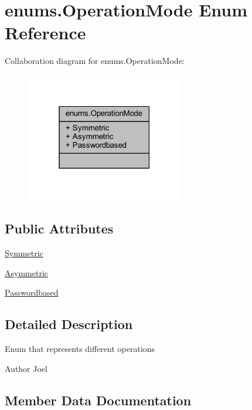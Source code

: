 \hypertarget{enumenums_1_1_operation_mode}{}\section{enums.\+Operation\+Mode Enum Reference}
\label{enumenums_1_1_operation_mode}


Collaboration diagram for enums.\+Operation\+Mode\+:\nopagebreak
\begin{figure}[H]
\begin{center}
\leavevmode
\includegraphics[width=195pt]{enumenums_1_1_operation_mode__coll__graph}
\end{center}
\end{figure}
\subsection*{Public Attributes}
\begin{DoxyCompactItemize}
\item 
\mbox{\hyperlink{enumenums_1_1_operation_mode_a29f20e790bc10adf40ae710c647c5823}{Symmetric}}
\item 
\mbox{\hyperlink{enumenums_1_1_operation_mode_a297ead778b4b5c3af6fadc9aeb47d11a}{Asymmetric}}
\item 
\mbox{\hyperlink{enumenums_1_1_operation_mode_a8d0719056b641107c56a4fd845a14595}{Passwordbased}}
\end{DoxyCompactItemize}


\subsection{Detailed Description}
Enum that represents different operations \begin{DoxyAuthor}{Author}
Joel 
\end{DoxyAuthor}


\subsection{Member Data Documentation}
\mbox{\label{enumenums_1_1_operation_mode_a297ead778b4b5c3af6fadc9aeb47d11a}} 
